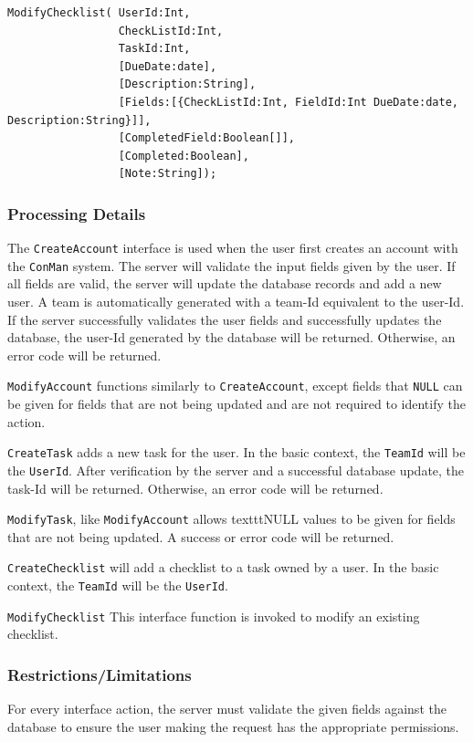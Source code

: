 \documentclass{article}
\begin{document}
\begin{lstlisting}
ModifyChecklist( UserId:Int,
                 CheckListId:Int,
                 TaskId:Int,
                 [DueDate:date],
                 [Description:String],
                 [Fields:[{CheckListId:Int, FieldId:Int DueDate:date, Description:String}]],
                 [CompletedField:Boolean[]],
                 [Completed:Boolean],
                 [Note:String]);
\end{lstlisting}

\subsubsection{Processing Details}
The \texttt{CreateAccount} interface is used when the user first creates an account with the \texttt{ConMan} system.
The server will validate the input fields given by the user.
If all fields are valid, the server will update the database records and add a new user.
A team is automatically generated with a team-Id equivalent to the user-Id.
If the server successfully validates the user fields and successfully updates the database, the user-Id generated by the database will be returned.
Otherwise, an error code will be returned.

\texttt{ModifyAccount} functions similarly to \texttt{CreateAccount}, except fields that \texttt{NULL} can be given for fields that are not being updated and are not required to identify the action.

\texttt{CreateTask} adds a new task for the user. 
In the basic context, the \texttt{TeamId} will be the \texttt{UserId}. 
After verification by the server and a successful database update, the task-Id will be returned.
Otherwise, an error code will be returned.

\texttt{ModifyTask}, like \texttt{ModifyAccount} allows texttt{NULL} values to be given for fields that are not being updated.
A success or error code will be returned.

\texttt{CreateChecklist} will add a checklist to a task owned by a user.
In the basic context, the \texttt{TeamId} will be the \texttt{UserId}.

\texttt{ModifyChecklist} This interface function is invoked to modify an existing checklist.
 
\subsubsection{Restrictions/Limitations}
For every interface action, the server must validate the given fields against the database to ensure the user making the request has the appropriate permissions.
\end{document}
